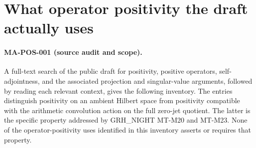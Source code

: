 \section{What operator positivity the draft actually uses}
\label{sec:positivity}

\paragraph{MA-POS-001 (source audit and scope).}
A full-text search of the public draft for positivity, positive
operators, self-adjointness, and the associated projection and
singular-value arguments, followed by reading each relevant context,
gives the following inventory. The entries distinguish positivity
on an ambient Hilbert space from positivity compatible with the
arithmetic convolution action on the full zero-jet quotient.
The latter is the specific property addressed by GRH\_NIGHT
MT-M20 and MT-M23. None of the operator-positivity uses identified
in this inventory asserts or requires that property.

